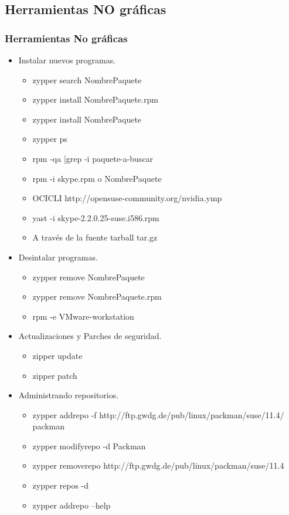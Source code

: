 \documentclass{beamer}
\begin{document}
\subsection{Herramientas NO gr\'aficas}
\begin{frame}
\frametitle{Herramientas No gr\'aficas}
	\begin{itemize}
	\item Instalar nuevos programas.
		\begin{itemize}
			\item \alert{zypper search  NombrePaquete}
			\item \alert{zypper install NombrePaquete.rpm}
			\item \alert{zypper install NombrePaquete}
			\item \alert{zypper ps}
			\item  rpm -qa |grep -i paquete-a-buscar
			\item  rpm -i skype.rpm o NombrePaquete
			\item OCICLI http://opensuse-community.org/nvidia.ymp
			\item yast -i skype-2.2.0.25-suse.i586.rpm
			\item A trav\'es de la fuente tarball tar.gz
		\end{itemize}
	\item Desintalar programas.
		\begin{itemize}
			\item zypper remove NombrePaquete
			\item zypper remove NombrePaquete.rpm
			\item rpm -e VMware-workstation 
		\end{itemize}
	\end{itemize}
\end{frame} 

\begin{frame}
\begin{itemize}
\item Actualizaciones y Parches de seguridad.
	\begin{itemize}
		\item zipper update
                \item zipper patch
        \end{itemize}
\item Administrando repositorios.
        \begin{itemize}
                \item zypper addrepo -f http://ftp.gwdg.de/pub/linux/packman/suse/11.4/ packman
                \item zypper modifyrepo -d Packman
                \item zypper removerepo http://ftp.gwdg.de/pub/linux/packman/suse/11.4
                \item zypper repos -d
                \item zypper addrepo --help
        \end{itemize}
\end{itemize}
\end{frame}
\end{document}
